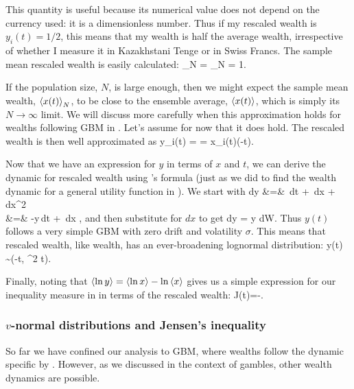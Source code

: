 This quantity is useful because its numerical value does not 
depend on the currency used: it is a dimensionless number. 
Thus if my rescaled wealth is $y_i(t) = 1/2$, this means that my wealth is half the 
average wealth, irrespective of whether I measure it in Kazakhstani Tenge 
or in Swiss Francs. The sample mean rescaled wealth is easily calculated:
\be
{}_N = _N = 1.
\ee

If the population size, $N$, is large enough, then we might expect the sample mean wealth, $\left\langle x(t) \right\rangle_N$, to be close to the ensemble average, $\left\langle x(t) \right\rangle$, which is simply its $N\to\infty$ limit. We will discuss more carefully when this approximation holds for wealths following GBM in . Let's assume for now that it does hold. The rescaled wealth is then well approximated as
\be
y_i(t) =  = x_i(t)\exp(-\mu t).
\ee

Now that we have an expression for $y$ in terms of $x$ and $t$, we can derive the dynamic for rescaled wealth using \Ito's formula (just as we did to find the wealth dynamic for a general utility function in ). We start with
\bea
dy &=& \,dt + \,dx +   \,dx^2 \\
&=& -\mu y\,dt + \,dx ,
\eea
and then substitute  for $dx$ to get
\be
dy = y \sigma dW.
\ee
Thus $y(t)$ follows a very simple GBM with zero drift and volatility $\sigma$. This means that rescaled wealth, like wealth, has an ever-broadening lognormal distribution:
\be
\ln y(t) \sim {}\left(-t, \sigma^2 t\right).
\ee

Finally, noting that $\left\langle\ln y \right\rangle=\left\langle\ln x \right\rangle-\ln\left\langle x \right\rangle$ gives us a simple expression for our inequality measure in  in terms of the rescaled wealth:
\be
J(t)=-.
\ee


\subsubsection{$v$-normal distributions and Jensen's inequality}
So far we have confined our analysis to GBM, where wealths follow the dynamic specific by . However, as we discussed in the context of gambles, other wealth dynamics are possible.

